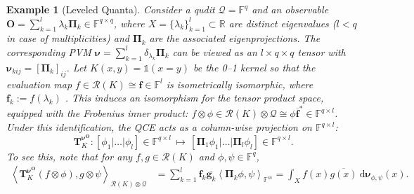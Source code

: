 \documentclass[noinfoline]{imsart}\setcounter{tocdepth}{2}
\renewcommand{\b}[1]{\mathbb{#1}} %
\newcommand{\m}[1]{\mathbf{#1}} %
\renewcommand{\c}[1]{\mathcal{#1}} %
\newcommand{\ds}[1]{\mathds{#1}} %
\newcommand{\mb}[1]{\boldsymbol{#1}} %
\newcommand{\rd}{\mathrm{d}} %
\newcommand{\innpr}[2]{{\left\langle {#1},{#2}\right\rangle}} %
\theoremstyle{plain}
\newtheorem{example}[theorem]{Example}
\begin{document}
\begin{example}[Leveled Quanta]
Consider a qudit $\c{Q} = \b{F}^{q}$ and an observable $\m{O} = \sum_{k=1}^{l} \lambda_{k} \m{\Pi}_{k} \in \b{F}^{q \times q}$,
where $X = \{\lambda_k\}_{k=1}^l \subset \b{R}$ are distinct eigenvalues ($l < q$ in case of multiplicities) and $\m{\Pi}_{k}$ are the associated eigenprojections. The corresponding PVM $\mb{\nu} = \sum_{k=1}^{l} \delta_{\lambda_{k}} \m{\Pi}_{k}$ can be viewed as an $l \times q \times q$ tensor with $\mb{\nu}_{kij} = [\m{\Pi}_{k}]_{ij}$.
Let $K(x, y) = \ds{1} (x = y)$ be the 0--1 kernel so that the evaluation map $f \in \c{R}(K) \cong \m{f} \in \b{F}^{l}$ is isometrically isomorphic, where $\m{f}_{k} := f(\lambda_{k})$ \cite{paulsen2016introduction}. This induces an isomorphism for the tensor product space, equipped with the Frobenius inner product: $f \otimes \phi \in \c{R}(K) \otimes \c{Q} \cong \phi \overline{\m{f}}^{*} \in \b{F}^{q \times l}$.
Under this identification, the QCE acts as a column-wise projection on $\b{F}^{q \times l}$:
\begin{equation*}
    \m{T}_{K}^{\mb{\nu}^{\m{O}}} : [\phi_{1} \vert \dots \vert \phi_{l}] \in \b{F}^{q \times l} \, \mapsto \, [\m{\Pi}_{1} \phi_{1} \vert \dots \vert \m{\Pi}_{l} \phi_{l}] \in \b{F}^{q \times l}.
\end{equation*}
To see this, note that for any $f, g \in \c{R}(K)$ and $\phi, \psi \in \b{F}^{q}$,
\begin{align*}
    \innpr{\m{T}_{K}^{\mb{\nu}^{\m{O}}} (f \otimes \phi)}{g \otimes \psi}_{\c{R}(K) \otimes \c{Q}} 
    &= \sum_{k=1}^{l} \m{f}_{k} \overline{\m{g}_{k}} \innpr{\m{\Pi}_{k} \phi}{\psi}_{\b{F}^{m}} = \int_{X} f(x) \overline{g(x)} \ \rd \mb{\nu}_{\phi, \psi}(x).
\end{align*}

\end{example}
\end{document}
